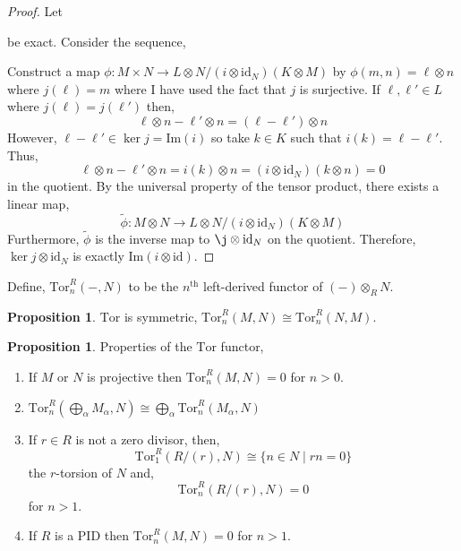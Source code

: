 \documentclass[12pt]{article}
\renewcommand{\Im}[1]{\mathrm{Im}(#1)}
\newcommand{\id}{\mathrm{id}}
\newcommand{\Tor}[4]{\mathrm{Tor}^{#1}_{#2} \left( #3, #4 \right)}
\theoremstyle{remark}
\theoremstyle{definition}
\newtheorem{proposition}[theorem]{Proposition}
\newenvironment{definition}[1][Definition:]{\begin{trivlist}
\item[\hskip \labelsep {\bfseries #1}]}{\end{trivlist}}
\begin{document}
\begin{proof}
Let
\begin{center}
\end{center}
be exact. Consider the sequence,
\begin{center}
\end{center}
Construct a map $\phi : M \times N \to L \otimes N / (i \otimes \id_N)(K \otimes M)$ by $\phi(m,n) = \ell \otimes n$ where $j(\ell) = m$ where I have used the fact that $j$ is surjective. If $\ell, \ell' \in L$ where $j(\ell) = j(\ell')$ then,
\[ \ell \otimes n - \ell' \otimes n = (\ell - \ell') \otimes n \]
However, $\ell - \ell' \in \ker{j} = \Im{i}$ so take $k \in K$ such that $i(k) = \ell - \ell'$. Thus,
\[  \ell \otimes n - \ell' \otimes n = i(k) \otimes n = (i \otimes \id_N)(k \otimes n) = 0 \]
in the quotient. By the universal property of the tensor product, there exists a linear map,
\[ \tilde{\phi} : M \otimes N \to  L \otimes N / (i \otimes \id_N)(K \otimes M) \]
Furthermore, $\tilde{\phi}$ is the inverse map to $\j \otimes \id_N$ on the quotient. Therefore, $\ker{j \otimes \id_N}$ is exactly $\Im{i \otimes \id}$. 
\end{proof}


\begin{definition}
Define, $\Tor{R}{n}{-}{N}$ to be the $n^\mathrm{th}$ left-derived functor of $(-) \otimes_R N$.
\end{definition}


\begin{proposition}
$\mathrm{Tor}$ is symmetric, $\Tor{R}{n}{M}{N} \cong \Tor{R}{n}{N}{M}$.
\end{proposition}

\begin{proposition}
Properties of the $\mathrm{Tor}$ functor,
\begin{enumerate}
\item If $M$ or $N$ is projective then $\Tor{R}{n}{M}{N} = 0$ for $n > 0$.

\item $\Tor{R}{n}{\bigoplus_{\alpha} M_\alpha}{N} \cong \bigoplus_{\alpha} \Tor{R}{n}{M_\alpha}{N}$

\item If $r \in R$ is not a zero divisor, then,
\[ \Tor{R}{1}{R/(r)}{N} \cong \{n \in N \mid rn = 0 \} \]
the $r$-torsion of $N$ and,
\[ \Tor{R}{n}{R/(r)}{N} = 0 \]
for $n > 1$.

\item If $R$ is a PID then $\Tor{R}{n}{M}{N} = 0$ for $n > 1$.
\end{enumerate}
\end{proposition}
\end{document}
